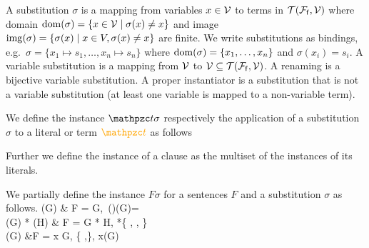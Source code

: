 


\begin{definition}\label{def:substitution}
	A {\myem substitution} $\sigma$ is a mapping from variables $x\in{\mathcal V}$ to terms in ${{\mathcal T}({\mathcal F}_{\mathsf f},{\mathcal V})}$
	where {\myem domain }$\operatorname{dom}(\sigma) = \{ x\in{\mathcal V}\mid\sigma(x) \neq x \}$ 
	and image $\operatorname{img}(\sigma) =\{ \sigma(x) \mid x\in V, \sigma(x)\neq x \}$ are finite.
	We write substitutions as bindings, e.g.~$\sigma=\{ x_1\mapsto s_1,\ldots,x_n\mapsto s_n \}$
	where $\operatorname{dom}(\sigma)=\{ x_1,\ldots,x_n \}$ and $\sigma(x_i)=s_i$.
	A {\myem variable substitution} is a mapping from ${\mathcal V}$ to ${\mathcal V}\subseteq{{\mathcal T}({\mathcal F}_{\mathsf f},{\mathcal V})}$.
	A {\myem renaming} is a bijective variable substitution.
	A {\myem proper instantiator} is a substitution that is not a variable substitution 
	(at least one variable is mapped to a non-variable term).
\end{definition}
\begin{definition}
	We define the instance $\mct\sigma$ 
	respectively the application of a substitution $\sigma$ to a literal or term $\foxt$ as follows

\noindent Further we define the instance of a clause as the multiset of the instances of its literals.
\end{definition}

\begin{definition}
	We partially define the instance $F\sigma$ for a sentences $F$ and a substitution $\sigma$ as follows.
{
		\lnot(G\sigma) & F = \lnot G,\ \colG\domain(\sigma)\cap\fvar(G)=\emptyset\\
		(G\sigma) * (H\sigma) & F = G * H, *\in \{ \land, \lor, \limp \}\\
		(G\sigma) &F = \quantify x G, \quantify\in\{ \forall,\exists \}, x\not\in\bvar(G)
	}
\end{definition}

